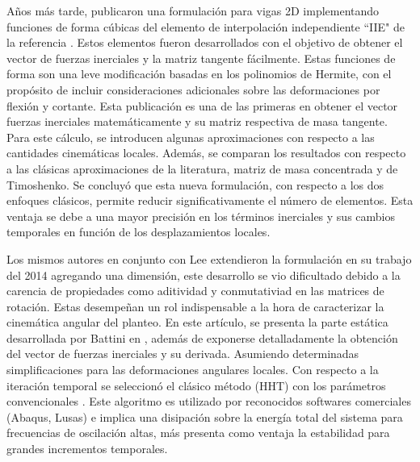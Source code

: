 Años más tarde, \cite{Le2011} publicaron una formulación para vigas 2D implementando funciones de forma cúbicas del elemento de interpolación independiente ``IIE" de la referencia \cite{reddy1997locking}. Estos elementos fueron desarrollados con el objetivo de obtener el vector de fuerzas inerciales y la matriz tangente fácilmente. Estas funciones de forma son una leve modificación basadas en los polinomios de Hermite, con el propósito de incluir consideraciones adicionales sobre las deformaciones por flexión y cortante. Esta publicación es una de las primeras en obtener el vector fuerzas inerciales matemáticamente y su matriz respectiva de masa tangente. Para este cálculo, se introducen algunas aproximaciones con respecto a las cantidades cinemáticas locales. Además, se comparan los resultados con respecto a las clásicas aproximaciones de la literatura, matriz de masa concentrada y de Timoshenko. Se concluyó que esta nueva formulación, con respecto a los dos enfoques clásicos, permite reducir significativamente el número de elementos. Esta ventaja se debe a una mayor precisión en los términos inerciales y sus cambios temporales en función de los desplazamientos locales.    

Los mismos autores en conjunto con Lee extendieron la formulación en su trabajo del 2014 \cite{Le2014} agregando una dimensión, este desarrollo se vio dificultado debido a la carencia de propiedades como aditividad y conmutativiad en las matrices de rotación. Estas desempeñan un rol indispensable a la hora de caracterizar la cinemática angular del planteo. En este artículo, se presenta la parte estática desarrollada por Battini en \cite{Battini2002}, además de exponerse detalladamente la obtención del vector de fuerzas inerciales y su derivada. Asumiendo determinadas simplificaciones para las deformaciones angulares locales. Con respecto a la iteración temporal se seleccionó el clásico método (\gls{HHT}) con los parámetros convencionales \citep{hilber1977improved}. Este algoritmo es utilizado por reconocidos softwares comerciales (Abaqus, Lusas) e implica una disipación sobre la energía total del sistema para frecuencias de oscilación altas, más presenta como ventaja la estabilidad para grandes incrementos temporales. 


